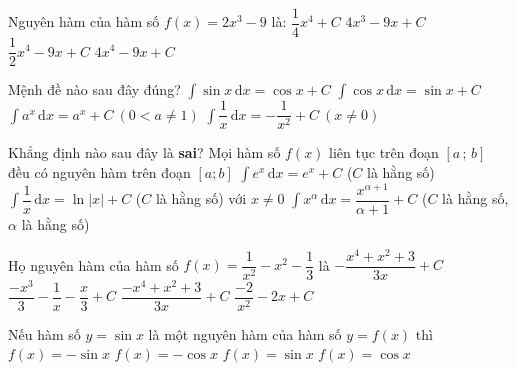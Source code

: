 \begin{ex}%
	Nguyên hàm của hàm số $ f(x)=2x^3-9$ là:
	\choice
	{$\dfrac{1}{4}{x^4}+C$}
	{$ 4x^3-9x+C$}
	{\True $\dfrac{1}{2}{x^4}-9x+C$}
	{$ 4x^4-9x+C$}
\end{ex}

\begin{ex}%
	Mệnh đề nào sau đây đúng?
	\choice
	{$\displaystyle\int\sin x\mathrm{\,d}x=\cos x+C$}
	{\True $\displaystyle\int\cos x\mathrm{\,d}x=\sin x+C$}
	{$\displaystyle\int a^x\mathrm{\,d}x=a^x+C~\left(0< a\ne 1\right)$}
	{$\displaystyle\int\dfrac{1}{x}\mathrm{\,d}x=-\dfrac{1}{x^2}+C~\left(x\ne 0\right)$}
\end{ex}

\begin{ex}%
	Khẳng định nào sau đây là \textbf{sai}?
	\choice
	{Mọi hàm số $ f(x)$ liên tục trên đoạn $\left[a\,;\,b\right]$ đều có nguyên hàm trên đoạn $\left[a;b\right]$}
	{$\displaystyle\int e^x\mathrm{\,d}x=e^x+C$ ($C$ là hằng số)}
	{$\displaystyle\int \dfrac{1}{x}\mathrm{\,d}x=\ln\left| x\right|+C$ ($ C$ là hằng số) với $ x\ne 0$}
	{\True $\displaystyle\int x^\alpha\mathrm{\,d}x=\dfrac{x^{\alpha+1}}{\alpha+1}+C$ ($ C$ là hằng số, $\alpha$ là hằng số)}
\end{ex}

\begin{ex}%
	Họ nguyên hàm của hàm số $ f(x)=\dfrac{1}{x^2}-x^2-\dfrac{1}{3}$ là
	\choice
	{$-\dfrac{x^4+x^2+3}{3x}+C$}
	{\True $\dfrac{-x^3}{3}-\dfrac{1}{x}-\dfrac{x}{3}+C$}
	{$\dfrac{-x^4+x^2+3}{3x}+C$}
	{$\dfrac{-2}{x^2}-2x+C$}
\end{ex}

\begin{ex}%
	Nếu hàm số $ y=\sin x$ là một nguyên hàm của hàm số $ y=f(x)$ thì
	\choice
	{$f(x)=-\sin x$}
	{$f(x)=-\cos x$}
	{$f(x)=\sin x$}
	{\True $f(x)=\cos x$}
\end{ex}

